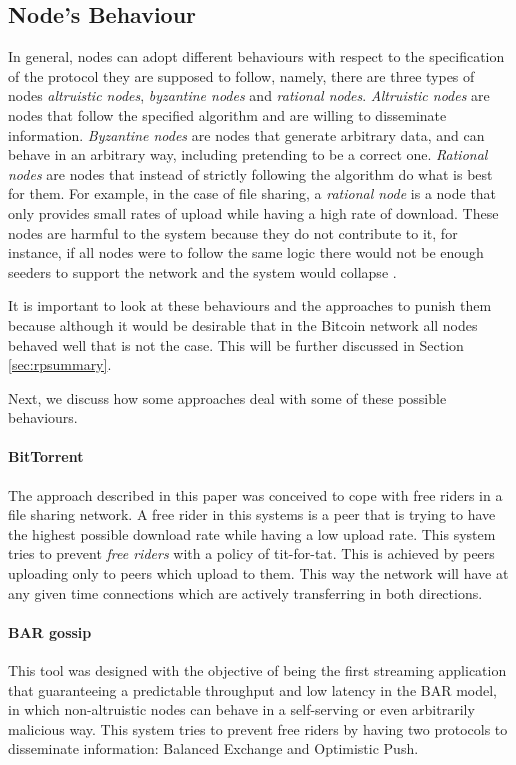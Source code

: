 \subsection{Node's Behaviour}
\label{sec:nodesbehaviour}
In general, nodes can adopt different behaviours with respect to the specification of the protocol they are supposed to follow, namely, there are three types of nodes \textit{altruistic nodes},  \textit{byzantine nodes} and \textit{rational nodes}. \textit{Altruistic nodes} are nodes that follow the specified algorithm and are willing to disseminate information. \textit{Byzantine nodes} are nodes that generate arbitrary data, and can behave in an arbitrary way, including pretending to be a correct one. \textit{Rational nodes} are nodes that instead of strictly following the algorithm do what is best for them. For example, in the case of file sharing, a \textit{rational node} is a node that only provides small rates of upload while having a high rate of download. These nodes are harmful to the system because they do not contribute to it, for instance, if all nodes were to follow the same logic there would not be enough seeders to support the network and the system would collapse \cite{li2006bar, cohen2003incentives}.

It is important to look at these behaviours and the approaches to punish them because although it would be desirable that in the Bitcoin network all nodes behaved well that is not the case. This will be further discussed in Section \ref{sec:rpsummary}.

Next, we discuss how some approaches deal with some of these possible behaviours.

\paragraph*{\textbf{BitTorrent} \cite{cohen2003incentives}} 
The approach described in this paper was conceived to cope with free riders in a file sharing network. A free rider in this systems is a peer that is trying to have the highest possible download rate while having a low upload rate. This system tries to prevent \textit{free riders} with a policy of tit-for-tat. This is achieved by peers uploading only to peers which upload to them. This way the network will have at any given time connections which are actively transferring in both directions.

\paragraph*{\textbf{BAR gossip} \cite{li2006bar}} 
This tool was designed with the objective of being the first streaming application that guaranteeing a predictable throughput and low latency in the BAR model, in which non-altruistic nodes can behave in a self-serving or even arbitrarily malicious way. This system tries to prevent free riders by having two protocols to disseminate information: Balanced Exchange and Optimistic Push.

